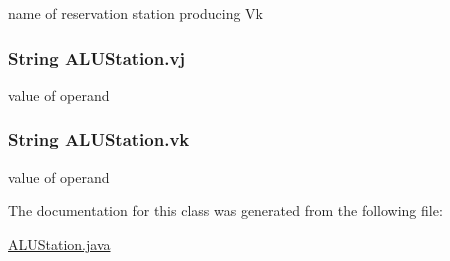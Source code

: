 name of reservation station producing \-Vk 

\hypertarget{classALUStation_a1b7e9688731461f02ed6dba04f2c367b}{
\subsubsection[{vj}]{\setlength{\rightskip}{0pt plus 5cm}\-String {\bf \-A\-L\-U\-Station.\-vj}}}\label{classALUStation_a1b7e9688731461f02ed6dba04f2c367b}


value of operand 

\hypertarget{classALUStation_aa9807e1058e78381d0682338bbf241fe}{
\subsubsection[{vk}]{\setlength{\rightskip}{0pt plus 5cm}\-String {\bf \-A\-L\-U\-Station.\-vk}}}\label{classALUStation_aa9807e1058e78381d0682338bbf241fe}


value of operand 



\-The documentation for this class was generated from the following file\-:\begin{DoxyCompactItemize}
\item 
\hyperlink{ALUStation_8java}{\-A\-L\-U\-Station.\-java}\end{DoxyCompactItemize}

